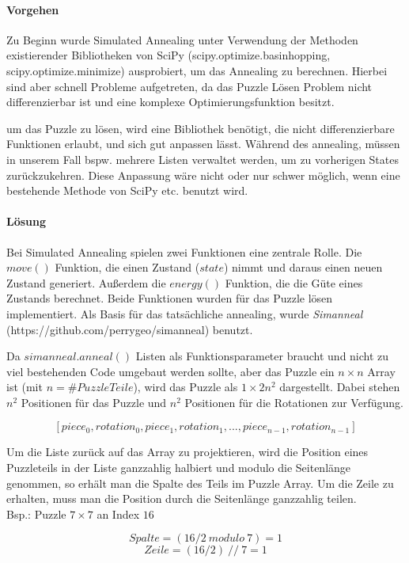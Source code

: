\paragraph{Vorgehen}
Zu Beginn wurde Simulated Annealing unter Verwendung der Methoden existierender Bibliotheken von SciPy (scipy.optimize.basinhopping, scipy.optimize.minimize) ausprobiert, um das Annealing zu berechnen. Hierbei sind aber schnell Probleme aufgetreten, da das Puzzle Lösen Problem nicht differenzierbar ist und eine komplexe Optimierungsfunktion besitzt.

um das Puzzle zu lösen, wird eine Bibliothek benötigt, die nicht differenzierbare Funktionen erlaubt, und sich gut anpassen lässt. Während des annealing, müssen in unserem Fall bspw. mehrere Listen verwaltet werden, um zu vorherigen States zurückzukehren. Diese Anpassung wäre nicht oder nur schwer möglich, wenn  eine bestehende Methode von SciPy etc. benutzt wird.

\paragraph{Lösung}
Bei Simulated Annealing spielen zwei Funktionen eine zentrale Rolle. Die $move()$ Funktion, die einen Zustand ($state$) nimmt und daraus einen neuen Zustand generiert. Außerdem die $energy()$ Funktion, die die Güte eines Zustands berechnet. Beide Funktionen wurden für das Puzzle lösen implementiert. Als Basis für das tatsächliche annealing, wurde \textit{Simanneal} (https://github.com/perrygeo/simanneal) benutzt.

Da $simanneal.anneal()$ Listen als Funktionsparameter braucht und nicht zu viel bestehenden Code umgebaut werden sollte, aber das Puzzle ein $n \times n$ Array ist (mit $n = \#PuzzleTeile$), wird das Puzzle als $1 \times 2n^2$ dargestellt. Dabei stehen $n^2$ Positionen für das Puzzle und $n^2$ Positionen für die Rotationen zur Verfügung.

$$
[piece_0, rotation_0, piece_1, rotation_1, ... , piece_{n-1}, rotation_{n-1}]
$$

Um die Liste zurück auf das Array zu projektieren, wird die Position eines Puzzleteils in der Liste ganzzahlig halbiert und modulo die Seitenlänge genommen, so erhält man die Spalte des Teils im Puzzle Array. Um die Zeile zu erhalten, muss man die Position durch die Seitenlänge ganzzahlig teilen. \\
Bsp.: Puzzle $7 \times 7$ an Index $ 16 $ 

$$
Spalte = (16/2 \ modulo \ 7) = 1 
$$
$$
Zeile = (16/2) \ // \ 7 = 1
$$

